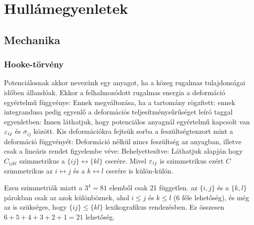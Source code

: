 \chapter{Hullámegyenletek}
 
 \section{Mechanika}
  
  \subsection{Hooke-törvény}
   
   Potenciálosnak akkor nevezünk egy anyagot, ha a közeg rugalmas tulajdonságai időben állandóak. Ekkor a felhalmozódott rugalmas energia a deformáció egyértelmű függvénye:
   Ennek megváltozása, ha a tartomány rögzített:
   ennek integrandusa pedig egyenlő a deformációs teljesítménysűrűséget leíró taggal  egyenletben:
%    
   Innen láthatjuk, hogy potenciálos anyagnál egyértelmű kapcsolt van $\varepsilon_{ij}$ és $\sigma_{ij}$ között. Kis deformációkra fejtsük sorba a feszültségtenzort mint a deformáció függvényét:
   Deformáció nélkül nincs feszültség az anyagban, illetve csak a lineáris rendet figyelembe véve:
   Behelyettesítve:
%    
   Láthatjuk  alapján hogy $C_{ijkl}$ szimmetrikus a $\{ij\}\leftrightarrow\{kl\}$ cserére. Mivel $\varepsilon_{ij}$ is szimmetrikus ezért $C$ szimmetrikus az $i\leftrightarrow j$ és a $k\leftrightarrow l$ cserére is külön-külön.
   
   Ezen szimmetriák miatt a $3^4=81$ elemből csak 21 független. az $\{i,j\}$ és a $\{k,l\}$ párokban csak az azok különböznek, ahol $i\leq j$ és $k\leq l$ (6 féle lehetőség), és még az is szükséges, hogy $\{ij\} \leq \{kl\}$ lexikografikus rendezésben. Ez összesen $6+5+4+3+2+1=21$ lehetőség. 
   
